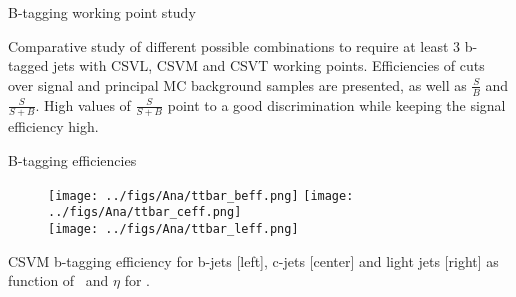 \begin{frame}{B-tagging working point study}
\vspace{-.2cm}
    \begin{block}{}
      \tiny \centering Comparative study of different possible combinations to require at least 3 b-tagged jets with CSVL, CSVM and CSVT working points. Efficiencies of cuts over signal and principal MC background samples are presented, as well as $\frac{S}{B}$ and $\frac{S}{S+B}$. High values of $\frac{S}{S+B}$ point to a good discrimination while keeping the signal efficiency high.
    \end{block}

\end{frame}

\begin{frame}{B-tagging efficiencies}
\vspace{-.2cm}
\begin{figure}[!Hhtbp]
  \begin{center}
    \texttt{[image: ../figs/Ana/ttbar\_beff.png]}
    \texttt{[image: ../figs/Ana/ttbar\_ceff.png]}\\
    \texttt{[image: ../figs/Ana/ttbar\_leff.png]}
  \end{center}
\end{figure}

\vspace{-.5cm}
    \begin{block}{}
      \tiny \centering CSVM b-tagging efficiency for b-jets [left], c-jets [center] and light jets [right] as function of \pt~and $\eta$ for \ttbar.
    \end{block}

\end{frame}
